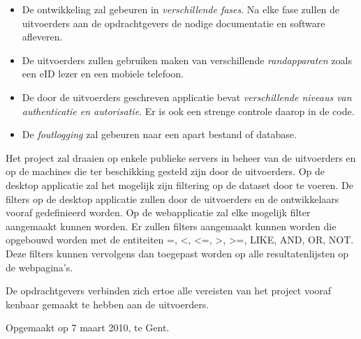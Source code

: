 \begin{itemize}
\item De ontwikkeling zal gebeuren in \emph{verschillende fases}. Na elke fase zullen de uitvoerders aan de opdrachtgevers de nodige documentatie en software afleveren.
\item De uitvoerders zullen gebruiken maken van verschillende \emph{randapparaten} zoals een eID lezer en een mobiele telefoon.
\item De door de uitvoerders geschreven applicatie bevat \emph{verschillende niveaus van authenticatie en autorisatie}. Er is ook een strenge controle daarop in de code.
\item De \emph{foutlogging} zal gebeuren naar een apart bestand of database.
\end{itemize}

Het project zal draaien op enkele publieke servers in beheer van de uitvoerders en op de machines die ter beschikking gesteld zijn door de uitvoerders.
Op de desktop applicatie zal het mogelijk zijn filtering op de dataset door te voeren. De filters op de desktop applicatie zullen door de uitvoerders en de ontwikkelaars vooraf gedefinieerd worden. Op de webapplicatie zal elke mogelijk filter aangemaakt kunnen worden. Er zullen filters aangemaakt kunnen worden die opgebouwd worden met de entiteiten =, <, <=, >, >=, LIKE, AND, OR, NOT. Deze filters kunnen vervolgens dan toegepast worden op alle resultatenlijsten op de webpagina's.

De opdrachtgevers verbinden zich ertoe alle vereisten van het project vooraf kenbaar gemaakt te hebben aan de uitvoerders.

Opgemaakt op 7 maart 2010, te Gent.

